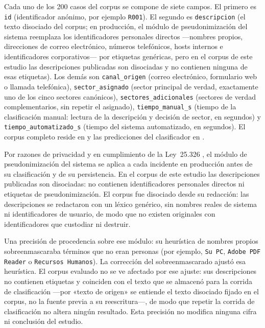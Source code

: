 Cada uno de los 200 casos del corpus se compone de siete campos. El primero es \texttt{id} (identificador anónimo, por ejemplo \texttt{R001}). El segundo es \texttt{descripcion} (el texto disociado del corpus; en producción, el módulo de pseudonimización del sistema reemplaza los identificadores personales directos ---nombres propios, direcciones de correo electrónico, números telefónicos, hosts internos e identificadores corporativos--- por etiquetas genéricas, pero en el corpus de este estudio las descripciones publicadas son disociadas y no contienen ninguna de esas etiquetas). Los demás son \texttt{canal\_origen} (correo electrónico, formulario web o llamada telefónica), \texttt{sector\_asignado} (sector principal de verdad, exactamente uno de los cinco sectores canónicos), \texttt{sectores\_adicionales} (sectores de verdad complementarios, sin repetir el asignado), \texttt{tiempo\_manual\_s} (tiempo de la clasificación manual: lectura de la descripción y decisión de sector, en segundos) y \texttt{tiempo\_automatizado\_s} (tiempo del sistema automatizado, en segundos). El corpus completo reside en  y las predicciones del clasificador en .

Por razones de privacidad y en cumplimiento de la Ley~25.326 \parencite{Ley25326_2000}, el módulo de pseudonimización del sistema se aplica a cada incidente en producción antes de su clasificación y de su persistencia. En el corpus de este estudio las descripciones publicadas son disociadas: no contienen identificadores personales directos ni etiquetas de pseudonimización. El corpus fue disociado desde su redacción: las descripciones se redactaron con un léxico genérico, sin nombres reales de sistema ni identificadores de usuario, de modo que no existen originales con identificadores que custodiar ni destruir.

Una precisión de procedencia sobre ese módulo: su heurística de nombres propios sobreenmascaraba términos que no eran personas (por ejemplo, \texttt{Su PC}, \texttt{Adobe PDF Reader} o \texttt{Recursos Humanos}). La corrección del sobreenmascarado ajustó esa heurística. El corpus evaluado no se ve afectado por ese ajuste: sus descripciones no contienen etiquetas y coinciden con el texto que se almacenó para la corrida de clasificación ---por «texto de origen» se entiende el texto disociado fijado en el corpus, no la fuente previa a su reescritura---, de modo que repetir la corrida de clasificación no altera ningún resultado. Esta precisión no modifica ninguna cifra ni conclusión del estudio.

